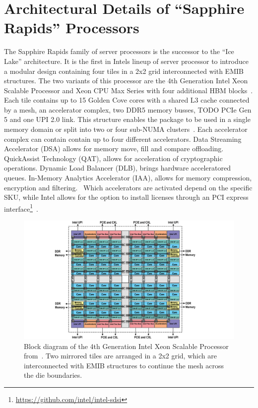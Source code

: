 \chapter{Architectural Details of ``Sapphire Rapids'' Processors}
The Sapphire Rapids family of server processors is the successor to the ``Ice Lake'' architecture.
It is the first in Intels lineup of server processor to introduce a modular design containing four tiles in a 2x2 grid interconnected with EMIB structures.
The two variants of this processor are the 4th Generation Intel Xeon Scalable Processor and Xeon CPU Max Series with four additional HBM blocks~\cite{Intel_2021_Hotchips}.
Each tile contains up to 15 Golden Cove cores with a shared L3 cache connected by a mesh, an accelerator complex, two DDR5 memory busses, TODO PCIe Gen 5 and one UPI 2.0 link.
This structure enables the package to be used in a single memory domain or split into two or four sub-NUMA clusters~\cite{Intel_4th_gen_scalable}.
Each accelerator complex can contain contain up to four different accelerators.
Data Streaming Accelerator (DSA) allows for memory move, fill and compare offloading.
QuickAssist Technology (QAT), allows for acceleration of cryptographic operations.
Dynamic Load Balancer (DLB), brings hardware acceleratored queues.
In-Memory Analytics Accelerator (IAA), allows for memory compression, encryption and filtering.~\cite{Yifan_2024_intel_accelerator_ecosystem,Yuan_2023_ISCA_tutorial,Intel_4th_gen_scalable}
Which accelerators are activated depend on the specific SKU, while Intel allows for the option to install licenses through an PCI express interface\footnote{\url{https://github.com/intel/intel-sdsi}}~\cite{Krenn_2025_Intel_on_demand}.


\begin{figure}[]
    \centering
    \includegraphics[width=\columnwidth]{fig/spr-uma.png}
    \caption{Block diagram of the 4th Generation Intel Xeon Scalable Processor from~\cite{Intel_4th_gen_scalable}.
Two mirrored tiles are arranged in a 2x2 grid, which are interconnected with EMIB structures to continue the mesh across the die boundaries.~\cite{Intel_2022_ISSCC}}
\end{figure}

